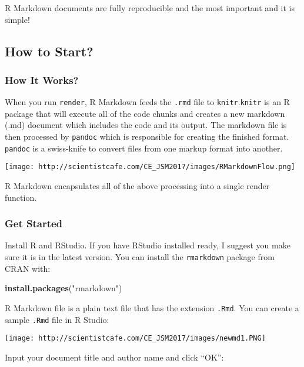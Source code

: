 \documentclass[
]{article}
\newenvironment{Shaded}{\begin{snugshade}}{\end{snugshade}}
\newcommand{\KeywordTok}[1]{\textcolor[rgb]{0.13,0.29,0.53}{\textbf{#1}}}
\newcommand{\NormalTok}[1]{#1}
\newcommand{\StringTok}[1]{\textcolor[rgb]{0.31,0.60,0.02}{#1}}
\begin{document}
R Markdown documents are fully reproducible and the most important and
it is simple!

\hypertarget{how-to-start}{%
\subsection{How to Start?}\label{how-to-start}}

\hypertarget{how-it-works}{%
\subsubsection{How It Works?}\label{how-it-works}}

When you run \texttt{render}, R Markdown feeds the \texttt{.rmd} file to
\texttt{knitr}.\texttt{knitr} is an R package that will execute all of
the code chunks and creates a new markdown (.md) document which includes
the code and its output. The markdown file is then processed by
\texttt{pandoc} which is responsible for creating the finished format.
\texttt{pandoc} is a swiss-knife to convert files from one markup format
into another.

\texttt{[image: http://scientistcafe.com/CE\_JSM2017/images/RMarkdownFlow.png]}

R Markdown encapsulates all of the above processing into a single render
function.

\hypertarget{get-started}{%
\subsubsection{Get Started}\label{get-started}}

Install R and RStudio. If you have RStudio installed ready, I suggest
you make sure it is in the latest version. You can install the
\texttt{rmarkdown} package from CRAN with:

\begin{Shaded}
\begin{Highlighting}[]
\KeywordTok{install.packages}\NormalTok{(}\StringTok{"rmarkdown"}\NormalTok{)}
\end{Highlighting}
\end{Shaded}

R Markdown file is a plain text file that has the extension
\texttt{.Rmd}. You can create a sample \texttt{.Rmd} file in R Studio:

\texttt{[image: http://scientistcafe.com/CE\_JSM2017/images/newmd1.PNG]}

Input your document title and author name and click ``OK'':
\end{document}
